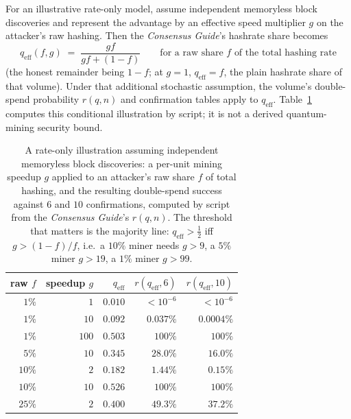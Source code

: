 \documentclass[11pt,a4paper]{article}
\theoremstyle{definition}
\begin{document}
For an illustrative rate-only model, assume independent memoryless block
discoveries and represent the advantage by an effective speed multiplier
$g$ on the attacker's raw hashing. Then the \emph{Consensus Guide}'s
hashrate share becomes
\[
  q_{\mathrm{eff}}(f, g) \;=\; \frac{g f}{g f + (1 - f)}
  \qquad \text{for a raw share } f \text{ of the total hashing rate}
\]
(the honest remainder being $1 - f$; at $g = 1$, $q_{\mathrm{eff}} = f$,
the plain hashrate share of that volume).
Under that additional stochastic assumption, the volume's double-spend
probability $r(q,n)$ and confirmation tables apply to $q_{\mathrm{eff}}$.
Table~\ref{tab:pq-qeff} computes this conditional illustration by script;
it is not a derived quantum-mining security bound.

\begin{table}[ht]
\centering
\small
\begin{tabular}{@{}r r r r r@{}}
\toprule
raw $f$ & speedup $g$ & $q_{\mathrm{eff}}$ & $r(q_{\mathrm{eff}},6)$ &
$r(q_{\mathrm{eff}},10)$ \\
\midrule
$1\%$  & $1$   & $0.010$ & ${<}10^{-6}$ & ${<}10^{-6}$ \\
$1\%$  & $10$  & $0.092$ & $0.037\%$    & $0.0004\%$ \\
$1\%$  & $100$ & $0.503$ & $100\%$      & $100\%$ \\
$5\%$  & $10$  & $0.345$ & $28.0\%$     & $16.0\%$ \\
$10\%$ & $2$   & $0.182$ & $1.44\%$     & $0.15\%$ \\
$10\%$ & $10$  & $0.526$ & $100\%$      & $100\%$ \\
$25\%$ & $2$   & $0.400$ & $49.3\%$     & $37.2\%$ \\
\bottomrule
\end{tabular}
\caption{A rate-only illustration assuming independent memoryless block
discoveries: a per-unit mining speedup $g$ applied to an attacker's raw
share $f$ of total hashing, and the resulting double-spend success
against $6$ and $10$ confirmations, computed by script from the
\emph{Consensus Guide}'s $r(q, n)$. The threshold that matters is the
majority line: $q_{\mathrm{eff}} > \tfrac12$ iff $g > (1 - f)/f$, i.e.\
a $10\%$ miner needs $g > 9$, a $5\%$ miner $g > 19$, a $1\%$ miner
$g > 99$.}
\label{tab:pq-qeff}
\end{table}
\end{document}

